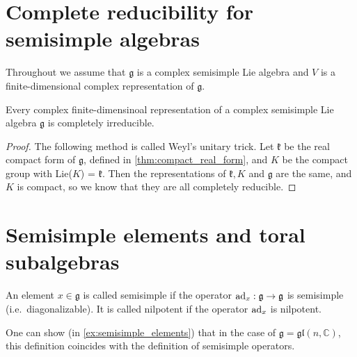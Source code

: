 \documentclass{report}
\begin{document}
\section{Complete reducibility for semisimple algebras}
Throughout we assume that $\mathfrak g$ is a complex semisimple Lie algebra and $V$ is a finite-dimensional complex representation of $\mathfrak g$. 
\begin{theorem}
    Every complex finite-dimensinoal representation of a complex semisimple Lie algebra $\mathfrak g$ is completely irreducible.
\end{theorem}
\begin{proof}
    The following method is called Weyl's unitary trick.
    Let $\mathfrak k$ be the real compact form of $\mathfrak g$, defined in \cref{thm:compact_real_form}, and $K$ be the compact group with Lie($K$) = $\mathfrak k$.
    Then the representations of $\mathfrak k, K$ and $\mathfrak g$ are the same, and $K$ is compact, so we know that they are all completely reducible.
\end{proof}

\section{Semisimple elements and toral subalgebras}
\begin{definition}
    An element $x \in \mathfrak g$ is called semisimple if the operator $\operatorname{ad}_x : \mathfrak g \to \mathfrak g$ is semisimple (i.e.\ diagonalizable).
    It is called nilpotent if the operator $\operatorname{ad}_x$ is nilpotent.
\end{definition}
One can show (in \cref{ex:semisimple_elements}) that in the case of $\mathfrak g = \mathfrak{gl}(n ,\mathbb C)$, this definition coincides with the definition of semisimple operators.
\end{document}
